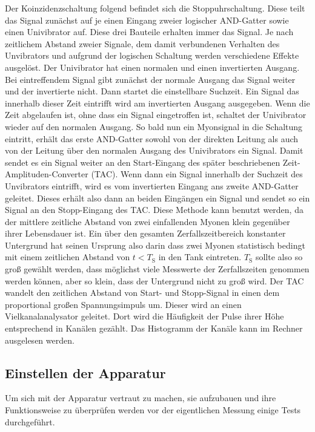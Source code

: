 Der Koinzidenzschaltung folgend befindet sich die Stoppuhrschaltung. Diese teilt das Signal zunächst auf je einen Eingang zweier logischer AND-Gatter sowie einen Univibrator auf. Diese drei Bauteile erhalten immer das Signal. Je nach zeitlichem Abstand zweier Signale, dem damit verbundenen Verhalten des Unvibrators und aufgrund der logischen Schaltung werden verschiedene Effekte ausgelöst.
Der Univibrator hat einen normalen und einen invertierten Ausgang. Bei eintreffendem Signal gibt zunächst der normale Ausgang das Signal weiter und der invertierte nicht. Dann startet die einstellbare Suchzeit. Ein Signal das innerhalb dieser Zeit eintrifft wird am invertierten Ausgang ausgegeben. Wenn die Zeit abgelaufen ist, ohne dass ein Signal eingetroffen ist, schaltet der Univibrator wieder auf den normalen Ausgang.
So bald nun ein Myonsignal in die Schaltung eintritt, erhält das erste AND-Gatter sowohl von der direkten Leitung als auch von der Leitung über den normalen Ausgang des Univibrators ein Signal.
Damit sendet es ein Signal weiter an den Start-Eingang des später beschriebenen Zeit-Amplituden-Converter (TAC).
Wenn dann ein Signal innerhalb der Suchzeit des Unvibrators eintrifft, wird es vom invertierten Eingang ans zweite AND-Gatter geleitet.
Dieses erhält also dann an beiden Eingängen ein Signal und sendet so ein Signal an den Stopp-Eingang des TAC.
Diese Methode kann benutzt werden, da der mittlere zeitliche Abstand von zwei einfallenden Myonen klein gegenüber ihrer Lebensdauer ist. Ein über den gesamten Zerfallszeitbereich konstanter Untergrund hat seinen Ursprung also darin dass zwei Myonen statistisch bedingt mit einem zeitlichen Abstand von $t<T_\text{S}$ in den Tank eintreten. $T_\text{S}$ sollte also so groß gewählt werden, dass möglichst viele Messwerte der Zerfallszeiten genommen werden können, aber so klein, dass der Untergrund nicht zu groß wird.
Der TAC wandelt den zeitlichen Abstand von Start- und Stopp-Signal in einen dem proportional großen Spannungsimpuls um. Dieser wird an einen Vielkanalanalysator geleitet. Dort wird die Häufigkeit der Pulse ihrer Höhe entsprechend in Kanälen gezählt.
Das Histogramm der Kanäle kann im Rechner ausgelesen werden.

\subsection{Einstellen der Apparatur}
Um sich mit der Apparatur vertraut zu machen, sie aufzubauen und ihre Funktionsweise zu überprüfen werden vor der eigentlichen Messung einige Tests durchgeführt.

